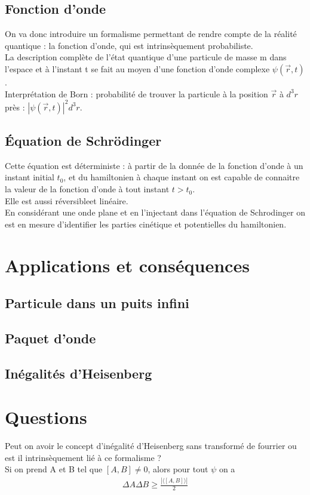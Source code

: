 \documentclass[12pt,prb,aps,epsf]{report}
\begin{document}
\subsection{Fonction d'onde}
On va donc introduire un formalisme permettant de rendre compte de la réalité quantique : la fonction d'onde, qui est intrinsèquement probabiliste.\\
La description complète de l'état quantique d'une particule de masse m dans l'espace et à l'instant t se fait au moyen d'une fonction d'onde complexe $\psi (\vec{r}, t)$.\\
Interprétation de Born : probabilité de trouver la particule à la position $\vec{r}$ à $d^3r$ près : $|\psi (\vec{r}, t)|^2d^3r$.

\subsection{Équation de Schrödinger}
Cette équation est déterministe : à partir de la donnée de la fonction d'onde à un instant initial $t_0$, et du hamiltonien à chaque instant on est capable de connaitre la valeur de la fonction d'onde à tout instant $t>t_0$.\\
Elle est aussi réversibleet linéaire.\\
En considérant une onde plane et en l'injectant dans l'équation de Schrodinger on est en mesure d'identifier les parties cinétique et potentielles du hamiltonien.

\section{Applications et conséquences}
\subsection{Particule dans un puits infini}
\subsection{Paquet d'onde}
\subsection{Inégalités d'Heisenberg}


\section*{Questions}
Peut on avoir le concept d'inégalité d'Heisenberg sans transformé de fourrier ou est il intrinsèquement lié à ce formalisme ?\\
Si on prend A et B tel que $[A,B]\neq 0$, alors pour tout $\psi$ on a 
\begin{eqnarray}
\Delta A \Delta B \geq \frac{|\langle[A,B]\rangle|}{2}
\end{eqnarray}
\end{document}
